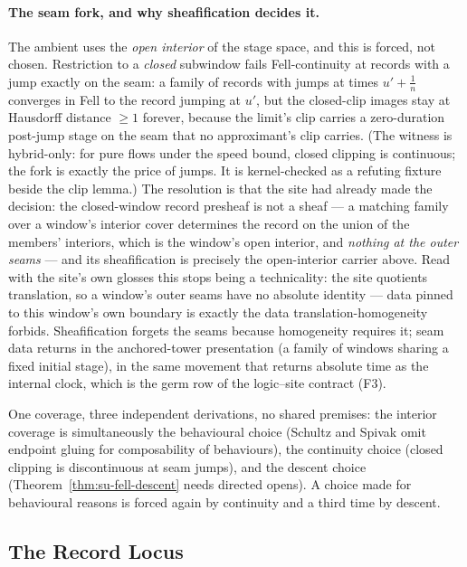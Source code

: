 \paragraph{The seam fork, and why sheafification decides it.}
The ambient uses the \emph{open interior} of the stage space, and
this is forced, not chosen. Restriction to a \emph{closed} subwindow
fails Fell-continuity at records with a jump exactly on the seam: a
family of records with jumps at times $u' + \tfrac1n$ converges in
Fell to the record jumping at $u'$, but the closed-clip images stay
at Hausdorff distance $\ge 1$ forever, because the limit's clip
carries a zero-duration post-jump stage on the seam that no
approximant's clip carries. (The witness is hybrid-only: for pure
flows under the speed bound, closed clipping is continuous; the fork
is exactly the price of jumps. It is kernel-checked as a refuting
fixture beside the clip lemma.) The resolution is that the
site had already made the decision: the closed-window record
presheaf is not a sheaf --- a matching family over a window's
interior cover determines the record on the union of the members'
interiors, which is the window's open interior, and \emph{nothing at
the outer seams} --- and its sheafification is precisely the
open-interior carrier above. Read with the site's own glosses this
stops being a technicality: the site quotients translation, so a
window's outer seams have no absolute identity --- data pinned to
this window's own boundary is exactly the data translation-homogeneity
forbids. Sheafification forgets the seams because homogeneity
requires it; seam data returns in the anchored-tower presentation
(a family of windows sharing a fixed initial stage), in the same
movement that returns absolute time as the internal clock, which is
the germ row of the logic--site contract (F3).

One coverage, three independent derivations, no shared premises: the
interior coverage is simultaneously the behavioural choice (Schultz
and Spivak omit endpoint gluing for composability of behaviours), the
continuity choice (closed clipping is discontinuous at seam jumps),
and the descent choice (Theorem~\ref{thm:su-fell-descent} needs
directed opens). A choice made for behavioural reasons is forced
again by continuity and a third time by descent.

\subsection{The Record Locus}

